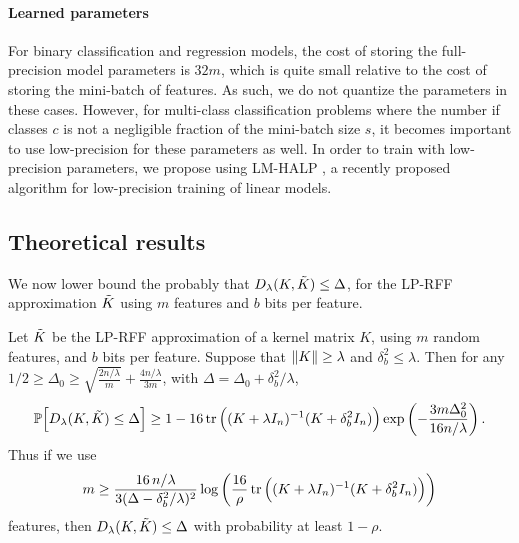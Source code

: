 \paragraph{Learned parameters} For binary classification and regression models, the cost of storing the full-precision model parameters is $32m$, which is quite small relative to the cost of storing the mini-batch of features. As such, we do not quantize the parameters in these cases. However, for multi-class classification problems where the number if classes $c$ is not a negligible fraction of the mini-batch size $s$, it becomes important to use low-precision for these parameters as well. In order to train with low-precision parameters, we propose using LM-HALP \citep{halp18}, a recently proposed algorithm for low-precision training of linear models.



\subsection{Theoretical results}
We now lower bound the probably that $D_{\lambda}(K,\tilde{K}) \leq \Delta$, for the LP-RFF approximation $\tilde{K}$ using $m$ features and $b$ bits per feature.

\begin{theorem}
	Let $\tilde{K}$ be the LP-RFF approximation of a kernel matrix $K$, using $m$ random features, and $b$ bits per feature. Suppose that $\|K\| \geq \lambda$ and $\delta^2_b \leq \lambda$.
	Then for any $1/2 \geq \Delta_0 \geq \sqrt{\frac{2n/\lambda}{m}} + \frac{4n/\lambda}{3m}$, with $\Delta =
	\Delta_0 + \delta^2_b / \lambda$,
	\begin{equation*}
	\mathbb{P}\Big[D_{\lambda}(K,\tilde{K}) \leq \Delta\Big] \geq 1 - 16 \mathop{\rm tr}\Big((K +
	\lambda I_n)^{-1} (K + \delta^2_b I_n)\Big) \exp \left( -\frac{3m \Delta_0^2}{16n/\lambda} \right).
	\end{equation*}
	Thus if we use 
	\begin{equation*}
	m \geq \frac{16\, n/\lambda}{3(\Delta - \delta_b^2/\lambda)^{2}} \log \bigg(\frac{16}{\rho} \mathop{\rm tr}\Big((K + \lambda I_n)^{-1} (K + \delta^2_b I_n)\Big) \bigg)
	\end{equation*}
	features, then $D_{\lambda}(K,\tilde{K}) \leq \Delta$	with probability at least $1 - \rho$.
\end{theorem}


